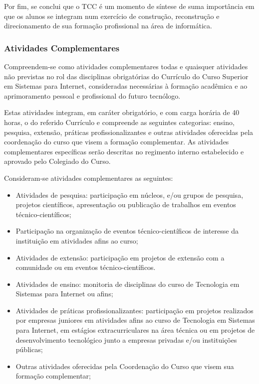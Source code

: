            Por fim, se conclui que o TCC é um momento de síntese de suma importância em que os alunos se integram num exercício de construção, reconstrução e direcionamento de sua formação profissional na área de informática.

\subsubsection{Atividades Complementares}

Compreendem-se como atividades complementares todas e quaisquer atividades não previstas no rol das disciplinas obrigatórias do Currículo do Curso Superior em Sistemas para Internet, consideradas necessárias à formação acadêmica e ao aprimoramento pessoal e profissional do futuro tecnólogo.

Estas atividades integram, em caráter obrigatório, e com carga horária de 40 horas, o do referido Currículo e compreende as seguintes categorias: ensino, pesquisa, extensão, práticas profissionalizantes e outras atividades oferecidas pela coordenação do curso que visem a formação complementar. As atividades complementares específicas serão descritas no regimento interno estabelecido e aprovado pelo Colegiado do Curso.

Consideram-se atividades complementares as seguintes:

\begin{itemize}
	\item Atividades de pesquisa: participação em núcleos, e/ou grupos de pesquisa, projetos científicos, apresentação ou publicação de trabalhos em eventos técnico-científicos;
	\item Participação na organização de eventos técnico-científicos de interesse da instituição em atividades afins ao curso;
	\item Atividades de extensão: participação em projetos de extensão com a comunidade ou em eventos técnico-científicos.
	\item Atividades de ensino: monitoria de disciplinas do curso de Tecnologia em Sistemas para Internet ou afins;
	\item Atividades de práticas profissionalizantes: participação em projetos realizados por empresas juniores em atividades afins ao curso de Tecnologia em Sistemas para Internet, em estágios extracurriculares na área técnica ou em projetos de desenvolvimento tecnológico junto a empresas privadas e/ou instituições públicas;
	\item Outras atividades oferecidas pela Coordenação do Curso que visem sua formação complementar;
\end{itemize}

